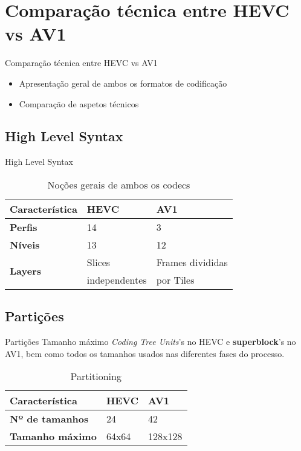 \documentclass{beamer}
\begin{document}
\section{Comparação técnica entre HEVC vs AV1}

\begin{frame}{Comparação técnica entre HEVC vs AV1}
	\begin{itemize}
		\item Apresentação geral de ambos os formatos de codificação
		\item Comparação de aspetos técnicos
	\end{itemize}
\end{frame}

\subsection{High Level Syntax}
\begin{frame}{High Level Syntax}
	\begin{table}
		\centering
		\begin{tabular}{l|l|l}
			\textbf{Característica} 					& \textbf{HEVC} 	& \textbf{AV1} \\\hline
			\textbf{Perfis} 									& 14 							& 3 \\
			\textbf{Níveis} 									& 13 							& 12 \\
			\multirow{2}{*}{\textbf{Layers}} 	& Slices 					& Frames divididas \\
																				& independentes 	& por Tiles \\
		\end{tabular}
		\caption{\label{tab:high-level}Noções gerais de ambos os codecs}
	\end{table}
\end{frame}

\subsection{Partições}
\begin{frame}{Partições}
	Tamanho máximo \textit{Coding Tree Units}'s no HEVC e \textbf{superblock}'s no AV1, bem como todos os tamanhos usados nas diferentes fases do processo.
	\begin{table}
		\centering
		\begin{tabular}{l|l|l}
			\textbf{Característica} 					& \textbf{HEVC} 	& \textbf{AV1} \\\hline
			\textbf{Nº de tamanhos} 						& 24 							& 42 \\
			\textbf{Tamanho máximo} 					& 64x64 					& 128x128
		\end{tabular}
		\caption{\label{tab:partitioning}Partitioning}
	\end{table}
\end{frame}
\end{document}

